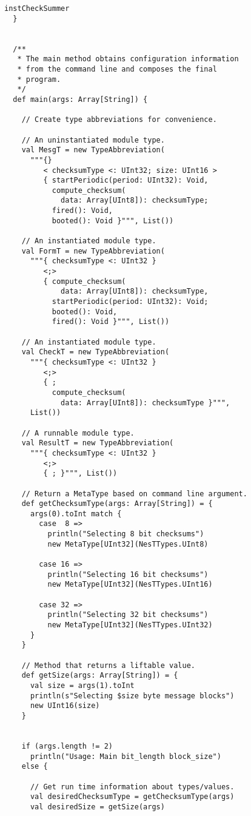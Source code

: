 \begin{lstlisting}[language=scalaness]
    instCheckSummer
  }

    
  /**
   * The main method obtains configuration information
   * from the command line and composes the final
   * program.
   */ 
  def main(args: Array[String]) {

    // Create type abbreviations for convenience.

    // An uninstantiated module type.
    val MesgT = new TypeAbbreviation(
      """{}
         < checksumType <: UInt32; size: UInt16 >
         { startPeriodic(period: UInt32): Void,
           compute_checksum(
             data: Array[UInt8]): checksumType;
           fired(): Void,
           booted(): Void }""", List())

    // An instantiated module type.
    val FormT = new TypeAbbreviation(
      """{ checksumType <: UInt32 }
         <;>
         { compute_checksum(
             data: Array[UInt8]): checksumType,
           startPeriodic(period: UInt32): Void;
           booted(): Void,
           fired(): Void }""", List())

    // An instantiated module type.
    val CheckT = new TypeAbbreviation(
      """{ checksumType <: UInt32 }
         <;>
         { ;
           compute_checksum(
             data: Array[UInt8]): checksumType }""",
      List())

    // A runnable module type.
    val ResultT = new TypeAbbreviation(
      """{ checksumType <: UInt32 }
         <;>
         { ; }""", List())

    // Return a MetaType based on command line argument.
    def getChecksumType(args: Array[String]) = {
      args(0).toInt match {
        case  8 => 
          println("Selecting 8 bit checksums")   
          new MetaType[UInt32](NesTTypes.UInt8)
        
        case 16 =>
          println("Selecting 16 bit checksums") 
          new MetaType[UInt32](NesTTypes.UInt16)

        case 32 =>
          println("Selecting 32 bit checksums")
          new MetaType[UInt32](NesTTypes.UInt32)
      }
    }

    // Method that returns a liftable value.
    def getSize(args: Array[String]) = {
      val size = args(1).toInt
      println(s"Selecting $size byte message blocks")
      new UInt16(size)
    }


    if (args.length != 2)
      println("Usage: Main bit_length block_size")
    else {
 
      // Get run time information about types/values.
      val desiredChecksumType = getChecksumType(args)
      val desiredSize = getSize(args)


\end{lstlisting}
